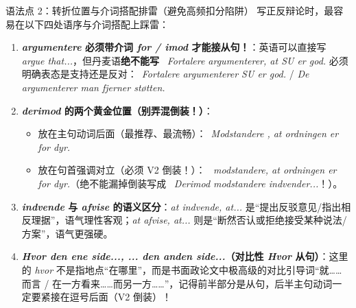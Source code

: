 \begin{grammatikbox}{语法点 2：转折位置与介词搭配排雷（避免高频扣分陷阱）}
写正反辩论时，最容易在以下四处语序与介词搭配上踩雷：
\begin{enumerate}
  \item \textbf{\textit{argumentere} 必须带介词 \textit{for / imod} 才能接从句！}：英语可以直接写 \textit{argue that...}，但丹麦语\textbf{绝不能写} \ \textit{Fortalere argumenterer, at SU er god.} 必须明确表态是支持还是反对：\ \textit{Fortalere argumenterer  SU er god.} / \textit{De argumenterer  man fjerner støtten.}
  \item \textbf{\textit{derimod} 的两个黄金位置（别弄混倒装！）}：
    \begin{itemize}
      \item 放在主句动词后面（最推荐、最流畅）：\ \textit{Modstandere , at ordningen er for dyr.}
      \item 放在句首强调对立（必须 V2 倒装！）：\ \textit{ modstandere, at ordningen er for dyr.}（绝不能漏掉倒装写成 \ \textit{Derimod modstandere indvender...}！）。
    \end{itemize}
  \item \textbf{\textit{indvende} 与 \textit{afvise} 的语义区分}：\textit{at indvende, at...} 是“提出反驳意见/指出相反理据”，语气理性客观；\textit{at afvise, at...} 则是“断然否认或拒绝接受某种说法/方案”，语气更强硬。
  \item \textbf{\textit{Hvor den ene side..., ... den anden side...}（对比性 \textit{Hvor} 从句）}：这里的 \textit{hvor} 不是指地点“在哪里”，而是书面政论文中极高级的对比引导词“就……而言 / 在一方看来……而另一方……”，记得前半部分是从句，后半主句动词一定要紧接在逗号后面（V2 倒装）！
\end{enumerate}
\end{grammatikbox}


